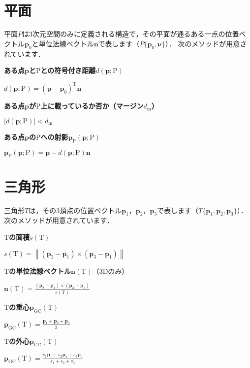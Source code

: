 ﻿\documentclass[a4paper]{jsarticle}
\begin{document}
\section{平面}

平面$P$は3次元空間のみに定義される構造で，その平面が通るある一点の位置ベクトル$\bm{p}_{0}$と単位法線ベクトル$\bm{n}$で表します（$P\{\bm{p}_{0},\bm{\nu}\}$）．
次のメソッドが用意されています．

{\bf ある点$\bm{p}$と$\mathrm{P}$との符号付き距離$d(\bm{p};\mathrm{P})$}

$d(\bm{p};\mathrm{P})=(\bm{p}-\bm{p}_{0})^{\mathrm{T}}\bm{n}$

{\bf ある点$\bm{p}$が$\mathrm{P}$上に載っているか否か（マージン$d_{\mathrm{m}}$）}

$\left|d(\bm{p};\mathrm{P})\right|<d_{\mathrm{m}}$

{\bf ある点$\bm{p}$の$\mathrm{P}$への射影$\bm{p}_{\mathrm{P}}(\bm{p};\mathrm{P})$}

$\bm{p}_{\mathrm{P}}(\bm{p};\mathrm{P})=\bm{p}-d(\bm{p};\mathrm{P})\bm{n}$



\section{三角形}

三角形$T$は，その3頂点の位置ベクトル$\bm{p}_{1}$，$\bm{p}_{2}$，$\bm{p}_{3}$で表します（$T\{\bm{p}_{1},\bm{p}_{2},\bm{p}_{3}\}$）．
次のメソッドが用意されています．

{\bf $\mathrm{T}$の面積$s(\mathrm{T})$}

$s(\mathrm{T})=\left\|(\bm{p}_{2}-\bm{p}_{1})\times(\bm{p}_{3}-\bm{p}_{1})\right\|$

{\bf $\mathrm{T}$の単位法線ベクトル$\bm{n}(\mathrm{T})$}（3Dのみ）

$\bm{n}(\mathrm{T})=\frac{(\bm{p}_{2}-\bm{p}_{1})\times(\bm{p}_{3}-\bm{p}_{1})}{s(\mathrm{T})}$

{\bf $\mathrm{T}$の重心$\bm{p}_{\mathrm{GC}}(\mathrm{T})$}

$\bm{p}_{\mathrm{GC}}(\mathrm{T})=\frac{\displaystyle \bm{p}_{1}+\bm{p}_{2}+\bm{p}_{3}}{3}$

{\bf $\mathrm{T}$の外心$\bm{p}_{\mathrm{CC}}(\mathrm{T})$}

$\bm{p}_{\mathrm{GC}}(\mathrm{T})=\frac{\displaystyle s_{1}\bm{p}_{1}+s_{2}\bm{p}_{2}+s_{3}\bm{p}_{3}}{s_{1}+s_{2}+s_{3}}$
\end{document}
